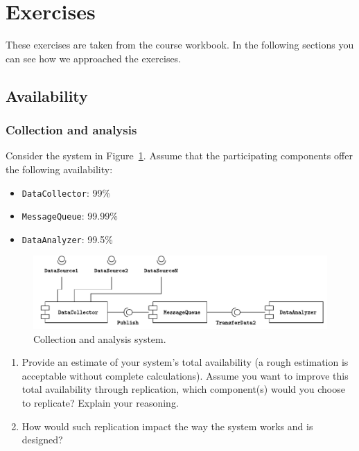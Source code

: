 \section{Exercises}

These exercises are taken from the course workbook. In the following sections you can see how we approached the exercises.

\subsection{Availability}

\subsubsection{Collection and analysis}

\descriptionproblem
Consider the system in Figure~\ref{fig: exercises - collection and analysis system}. Assume that the participating components offer the following availability:
\begin{itemize}
    \item \texttt{DataCollector}: 99\%
    \item \texttt{MessageQueue}: 99.99\%
    \item \texttt{DataAnalyzer}: 99.5\%
\end{itemize}

\begin{figure}[!htp]
    \centering
    \includegraphics[width=\textwidth]{img/collection-and-analysis-1.pdf}
    \caption{Collection and analysis system.}
    \label{fig: exercises - collection and analysis system}
\end{figure}

\questionproblem
\begin{enumerate}
    \item Provide an estimate of your system's total availability (a rough estimation is acceptable without complete calculations). Assume you want to improve this total availability through replication, which component(s) would you choose to replicate? Explain your reasoning.
    
    \item How would such replication impact the way the system works and is designed?
\end{enumerate}

